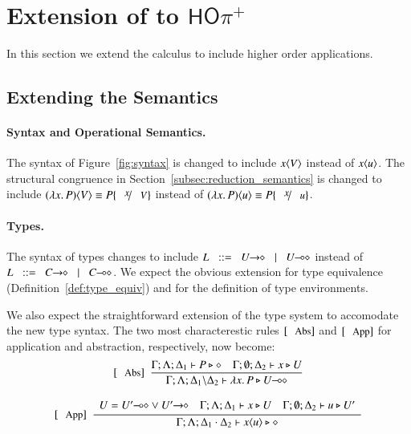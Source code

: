 \newcommand{\HOpp}{\ensuremath{\mathsf{HO\pi^{+}}}\xspace}
\section{Extension of \HOp to \HOpp}

In this section we extend the \HOp calculus to include higher order applications.

\subsection{Extending the Semantics}

\paragraph{Syntax and Operational Semantics.}

The syntax of Figure~\ref{fig:syntax} is changed to include $x\langle V \rangle$
instead of $x\langle u \rangle$.
The structural congruence in Section~\ref{subsec:reduction_semantics}
is changed to include $\appl{(\abs{x} P)}{V} \scong P \subst{x}{V}$
instead of $\appl{(\abs{x} P)}{u} \scong P \subst{x}{u}$.

\paragraph{Types.}

The syntax of types changes to include $L \bnfis \shot{U} \bnfbar \lhot{U}$
instead of $L \bnfis \shot{C} \bnfbar \lhot{C}$. We expect the obvious
extension for type equivalence (Definition~\ref{def:type_equiv})
and for the definition of type environments.

We also expect the straightforward extension of the type 
system to accomodate the new type syntax. The two
most characterestic rules $\trule{Abs}$ and $\trule{App}$ 
for application and abstraction, respectively, now become:
\[
	\begin{array}{c}
		\trule{Abs}~~\tree{
			\Gamma; \Lambda; \Delta_1 \proves P \hastype \Proc
			\quad
			\Gamma; \es; \Delta_2 \proves x \hastype U
		}{
			\Gamma; \Lambda; \Delta_1 \backslash \Delta_2 \proves \abs{x}{P} \hastype \lhot{U}
		}
		\\[6mm]

		\trule{App}~~\tree{
			\begin{array}{c}
				U = \lhot{U'} \lor \shot{U'}
				\quad
				\Gamma; \Lambda; \Delta_1 \proves x \hastype U
				\quad
				\Gamma; \es; \Delta_2 \proves u \hastype U'
			\end{array}
		}{
			\Gamma; \Lambda; \Delta_1 \cat \Delta_2 \proves \appl{x}{u} \hastype \Proc
		} 
	\end{array}
\]


